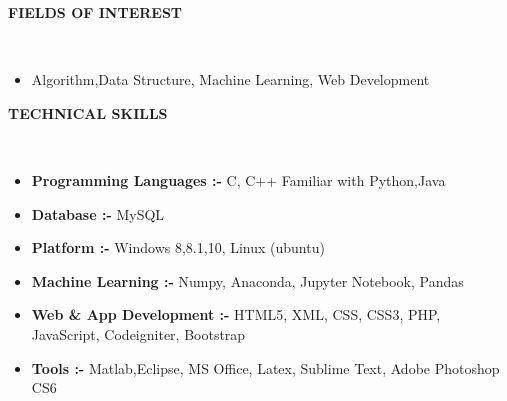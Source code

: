 \documentclass[a4paper,10pt]{article}
\newcommand{\lsep}{-0.5cm}
\newcommand{\resheading}[1]{{\small \colorbox{mygrey}{\begin{minipage}{0.975\textwidth}{\textbf{#1 \vphantom{p\^{E}}}}\end{minipage}}}}
\begin{document}
\resheading{\textbf{FIELDS OF INTEREST} }\\[\lsep]
\begin{itemize}
\item \noindent Algorithm,Data Structure, Machine Learning, Web Development
\end{itemize}

\resheading{\textbf{TECHNICAL SKILLS} }\\[\lsep]
\begin{itemize}
\item \noindent \textbf{Programming Languages :- } C, C++ Familiar with Python,Java
\item \textbf{Database :- } MySQL
\item \textbf{Platform :- } Windows 8,8.1,10, Linux (ubuntu)
\item \textbf{Machine Learning :- } Numpy, Anaconda, Jupyter Notebook, Pandas
\item \textbf{Web & App Development :- } HTML5, XML, CSS, CSS3, PHP, JavaScript, Codeigniter, Bootstrap
\item \textbf{Tools :- } Matlab,Eclipse, MS Office, Latex, Sublime Text, Adobe Photoshop CS6
\end{itemize}
\end{document}
